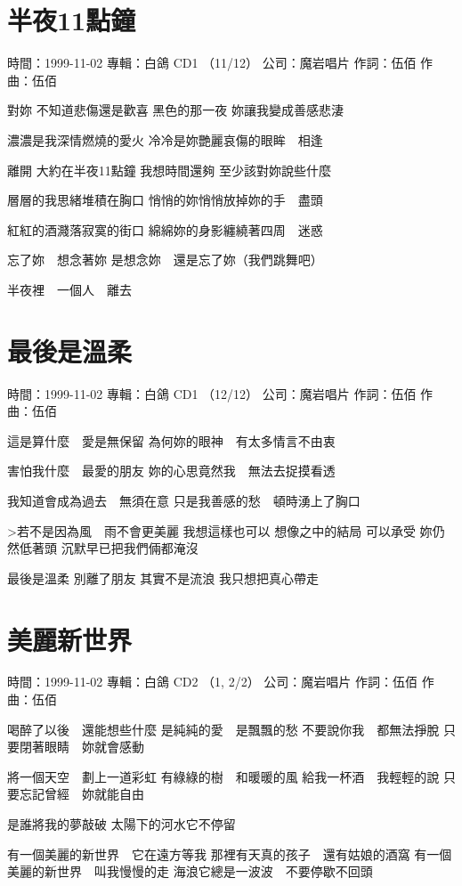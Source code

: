 \documentclass[UTF8,a4paper,oneside,twocolumn,12pt]{ctexbook}
\newcommand{\infopair}[2]{\textbullet #1：#2}
\newcommand{\zc}[1][伍佰]{\infopair{作詞}{#1}}
\newcommand{\zq}[1][伍佰]{\infopair{作曲}{#1}}
\newcommand{\zj}[1]{\infopair{專輯}{#1}}
\newcommand{\sj}[1]{\infopair{時間}{#1}}
\newcommand{\gs}[1]{\infopair{公司}{#1}}
\newenvironment{info}{\begin{flushleft}\kaishu
	}
	{\end{flushleft}\normalsize\yahei\par}
\newenvironment{lyric}{
	}
{}
\begin{document}
\section{半夜11點鐘}
\begin{info}
	\sj{1999-11-02}
	\zj{白鴿 CD1 （11/12）}
	\gs{魔岩唱片}
	\zc
	\zq
\end{info}
\begin{lyric}
	對妳
	不知道悲傷還是歡喜
	黑色的那一夜
	妳讓我變成善感悲淒

	濃濃是我深情燃燒的愛火
	冷冷是妳艷麗哀傷的眼眸　相逢

	離開
	大約在半夜11點鐘
	我想時間還夠
	至少該對妳說些什麼

	層層的我思緒堆積在胸口
	悄悄的妳悄悄放掉妳的手　盡頭

	紅紅的酒濺落寂寞的街口
	綿綿妳的身影纏繞著四周　迷惑

	忘了妳　想念著妳
	是想念妳　還是忘了妳（我們跳舞吧）

	半夜裡　一個人　離去
\end{lyric}

\section{最後是溫柔}
\begin{info}
	\sj{1999-11-02}
	\zj{白鴿 CD1 （12/12）}
	\gs{魔岩唱片}
	\zc
	\zq
\end{info}
\begin{lyric}
	這是算什麼　愛是無保留
	為何妳的眼神　有太多情言不由衷

	害怕我什麼　最愛的朋友
	妳的心思竟然我　無法去捉摸看透

	我知道會成為過去　無須在意
	只是我善感的愁　頓時湧上了胸口

	>若不是因為風　雨不會更美麗
	我想這樣也可以
	想像之中的結局
	可以承受
	妳仍然低著頭
	沉默早已把我們倆都淹沒

	最後是溫柔
	別離了朋友
	其實不是流浪
	我只想把真心帶走
\end{lyric}

\section{美麗新世界}
\begin{info}
	\sj{1999-11-02}
	\zj{白鴿 CD2 （1, 2/2）}
	\gs{魔岩唱片}
	\zc
	\zq
\end{info}
\begin{lyric}
	喝醉了以後　還能想些什麼
	是純純的愛　是飄飄的愁
	不要說你我　都無法掙脫
	只要閉著眼睛　妳就會感動

	將一個天空　劃上一道彩虹
	有綠綠的樹　和暖暖的風
	給我一杯酒　我輕輕的說
	只要忘記曾經　妳就能自由

	是誰將我的夢敲破
	太陽下的河水它不停留

	有一個美麗的新世界　它在遠方等我
	那裡有天真的孩子　還有姑娘的酒窩
	有一個美麗的新世界　叫我慢慢的走
	海浪它總是一波波　不要停歇不回頭
\end{lyric}
\end{document}
